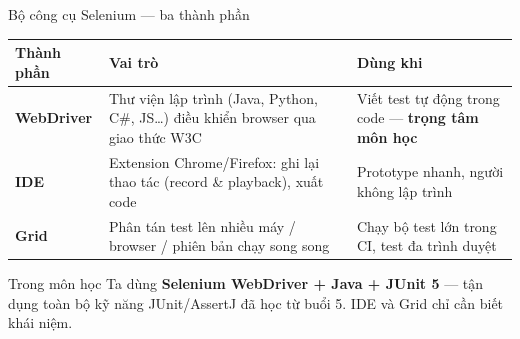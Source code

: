 \documentclass[aspectratio=169,12pt]{beamer}
\begin{document}
\begin{frame}{Bộ công cụ Selenium --- ba thành phần}
  \begin{center}
  \small
  \setlength{\tabcolsep}{4pt}
  \begin{tabular}{p{2.9cm}p{6.3cm}p{3.4cm}}
    \toprule
    \textbf{Thành phần} & \textbf{Vai trò} & \textbf{Dùng khi} \\
    \midrule
    \textbf{WebDriver} & Thư viện lập trình (Java, Python, C\#, JS\ldots) điều khiển browser qua giao thức W3C & Viết test tự động trong code --- \textbf{trọng tâm môn học} \\
    \textbf{IDE} & Extension Chrome/Firefox: ghi lại thao tác (record \& playback), xuất code & Prototype nhanh, người không lập trình \\
    \textbf{Grid} & Phân tán test lên nhiều máy / browser / phiên bản chạy song song & Chạy bộ test lớn trong CI, test đa trình duyệt \\
    \bottomrule
  \end{tabular}
  \end{center}

  \begin{alertblock}{Trong môn học}
    Ta dùng \textbf{Selenium WebDriver + Java + JUnit 5} --- tận dụng toàn bộ
    kỹ năng JUnit/AssertJ đã học từ buổi 5.
    IDE và Grid chỉ cần biết khái niệm.
  \end{alertblock}
\end{frame}
\end{document}
